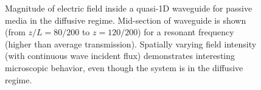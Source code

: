 \begin{figure}
\vskip -0.5cm
\centerline{
}
\vskip -0.5cm
\caption{Magnitude of electric field inside a quasi-1D waveguide for passive media in the diffusive regime. Mid-section of waveguide is shown (from $z/L=80/200$ to $z=120/200$) for a resonant frequency (higher than average transmission). Spatially varying field intensity (with continuous wave incident flux) demonstrates interesting microscopic behavior, even though the system is in the diffusive regime.}
\label{fig:electric_field_zoomed}
\end{figure}

